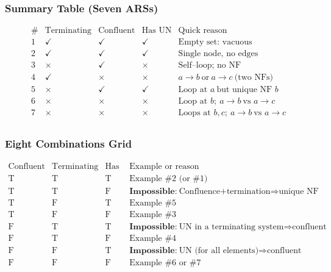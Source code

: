 \documentclass{article}
\theoremstyle{theorem}
\theoremstyle{definition}
\theoremstyle{remark}
\begin{document}
\subsubsection*{Summary Table (Seven ARSs)}
\[
\begin{array}{c|c|c|c|l}
\# & \text{Terminating} & \text{Confluent} & \text{Has UN} & \text{Quick reason} \\\hline
1 & \checkmark & \checkmark & \checkmark & \text{Empty set: vacuous} \\
2 & \checkmark & \checkmark & \checkmark & \text{Single node, no edges} \\
3 & \times & \checkmark & \times & \text{Self–loop; no NF} \\
4 & \checkmark & \times & \times & a\to b\ \text{or}\ a\to c\ \text{(two NFs)} \\
5 & \times & \checkmark & \checkmark & \text{Loop at }a\ \text{but unique NF }b \\
6 & \times & \times & \times & \text{Loop at }b;\ a\to b\ \text{vs }a\to c \\
7 & \times & \times & \times & \text{Loops at }b,c;\ a\to b\ \text{vs }a\to c \\
\end{array}
\]

\subsubsection*{Eight Combinations Grid}
\[
\begin{array}{c|c|c|l}
\text{Confluent} & \text{Terminating} & \text{Has UN} & \text{Example or reason} \\\hline
\text{T} & \text{T} & \text{T} & \text{Example \#2 (or \#1)} \\
\text{T} & \text{T} & \text{F} & \textbf{Impossible:}\ \text{Confluence+termination}\Rightarrow\text{unique NF} \\
\text{T} & \text{F} & \text{T} & \text{Example \#5} \\
\text{T} & \text{F} & \text{F} & \text{Example \#3} \\
\text{F} & \text{T} & \text{T} & \textbf{Impossible:}\ \text{UN in a terminating system}\Rightarrow\text{confluent} \\
\text{F} & \text{T} & \text{F} & \text{Example \#4} \\
\text{F} & \text{F} & \text{T} & \textbf{Impossible:}\ \text{UN (for all elements)}\Rightarrow\text{confluent} \\
\text{F} & \text{F} & \text{F} & \text{Example \#6 or \#7} \\
\end{array}
\]
\end{document}
